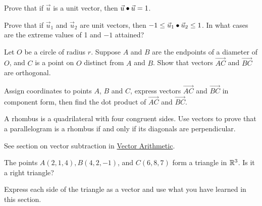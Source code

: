 \documentclass{ximera}
\begin{document}
\begin{problem}\label{prob:unitvectordot}
Prove that if $\vec{u}$ is a unit vector, then $\vec{u}\bullet \vec{u}=1$.
\end{problem}
 
\begin{problem}\label{prob:unitvectordot1}
 Prove that if $\vec{u}_1$ and $\vec{u}_2$ are unit vectors, then $-1\leq\vec{u}_1\bullet \vec{u}_2\leq 1$.  In what cases are the extreme values of 1 and $-1$ attained?
\end{problem}

 
\begin{problem} \label{prob:righttriangleincircle}
Let $O$ be a circle of radius $r$.  Suppose $A$ and $B$ are the endpoints of a diameter of $O$, and $C$ is a point on $O$ distinct from $A$ and $B$. Show that vectors $\overrightarrow{AC}$ and $\overrightarrow{BC}$ are orthogonal. 
 
\begin{hint}
Assign coordinates to points $A$, $B$ and $C$, express vectors $\overrightarrow{AC}$ and $\overrightarrow{BC}$ in component form, then find the dot product of $\overrightarrow{AC}$ and $\overrightarrow{BC}$.
\end{hint}
 
\begin{center}
\end{center}
\end{problem}
 
\begin{problem}\label{prob:rhombusdot} A rhombus is a quadrilateral with four congruent sides.  Use vectors to prove that a parallelogram is a rhombus if and only if its diagonals are perpendicular.
\begin{hint}
See section on vector subtraction in \href{https://ximera.osu.edu/oerlinalg/LinearAlgebra/VEC-0030/main}{Vector Arithmetic}.
\end{hint}
\end{problem}
 
\begin{problem}\label{prob:pythagoreanR3usedotp}
 The points $A(2,1,4),B(4,2,-1)$, and $C(6,8,7)$ form a triangle in $\mathbb{R}^3$.  Is it a right triangle?
\begin{hint}
Express each side of the triangle as a vector and use what you have learned in this section.
\end{hint}
\end{problem}
\end{document}
